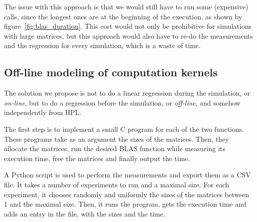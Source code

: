 \documentclass[12pt, a4paper]{memoir}
\begin{document}
The issue with this approach is that we would still have to run some (expensive) calls, since the longest ones are
at the beginning of the execution, as shown by figure~\ref{fig:blas_duration}. This cost would not only be
prohibitive for simulations with large matrices, but this approach would also have to re-do the measurements and the
regression for every simulation, which is a waste of time.
\subsection{Off-line modeling of computation kernels}
\label{sec:org04b4653}
The solution we propose is not to do a linear regression during the simulation, or \emph{on-line}, but to do a regression
before the simulation, or \emph{off-line}, and somehow independently from HPL.

The first step is to implement a small C program for each of the two functions. These programs take as an argument
the sizes of the matrices. Then, they allocate the matrices, run the desired BLAS function while measuring its
execution time, free the matrices and finally output the time.

A Python script is used to perform the measurements and export them as a CSV file. It takes a number of experiments
to run and a maximal size. For each experiment, it chooses randomly and uniformly the sizes of the matrices between
1 and the maximal size. Then, it runs the program, gets the execution time and adds an entry in the file, with the
sizes and the time.
\end{document}
